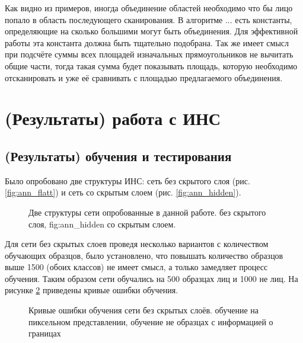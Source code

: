 \documentclass[12pt]{report}
\begin{document}
Как видно из примеров, иногда объединение областей необходимо что бы лицо попало в область последующего 
сканирования.   
В алгоритме ... есть константы, определяющие на сколько большими могут быть объединения. Для эффективной работы эта 
константа должна быть тщательно подобрана. Так же имеет смысл при подсчёте суммы всех площадей изначальных 
прямоугольников не вычитать общие части, тогда такая сумма будет показывать площадь, которую необходимо 
отсканировать  
и уже её сравнивать с площадью предлагаемого объединения.

\section{(Результаты) работа с ИНС}

\subsection{(Результаты) обучения и тестирования}

Было опробовано две структуры ИНС: сеть без скрытого слоя (рис. \ref{fig:ann_flatt}) и сеть со скрытым слоем (рис. 
\ref{fig:ann_hidden}).

\begin{figure}[h]
	\centering
	\caption{Две структуры сети опробованные в данной работе.  без скрытого слоя, \subref
{fig:ann_hidden} со скрытым слоем.}
	\label{fig:ann_structure}
\end{figure}

Для сети без скрытых слоев проведя несколько вариантов с количеством обучающих образцов, было установлено, что 
повышать количество образцов выше 1500 (обоих классов) не имеет смысл, а только замедляет процесс обучения. Таким 
образом сети обучались на 500 образцах лиц и 1000 не лиц. На рисунке \ref{fig:ann_flat_chart} приведены кривые 
ошибки 
обучения.

\begin{figure}[h]
	\centering
	\caption{Кривые ошибки обучения сети без скрытых слоёв.  обучение на пиксельном 
представлении, 
 обучение не образцах с информацией о границах}
	\label{fig:ann_flat_chart}
\end{figure}
\end{document}

